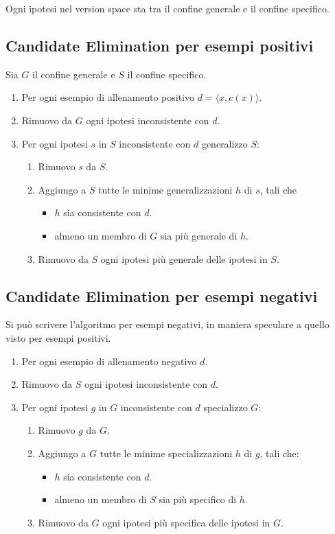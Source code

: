 \begin{theorem}
	Ogni ipotesi nel version space sta tra il confine generale e il confine specifico.
\end{theorem}

\subsection{Candidate Elimination per esempi positivi}
Sia $G$ il confine generale e $S$ il confine specifico.
\begin{enumerate}
	\item Per ogni esempio di allenamento positivo $d = \langle x, c(x) \rangle$.
	\item Rimuovo da $G$ ogni ipotesi inconsistente con $d$.
	\item Per ogni ipotesi $s$ in $S$ inconsistente con $d$ generalizzo $S$:
	      \begin{enumerate}
		      \item Rimuovo $s$ da $S$.
		      \item Aggiungo a $S$ tutte le minime generalizzazioni $h$ di $s$, tali che
		            \begin{itemize}
			            \item $h$ sia consistente con $d$.
			            \item almeno un membro di $G$ sia pi\`u generale di $h$.
		            \end{itemize}
		      \item Rimuovo da $S$ ogni ipotesi pi\`u generale delle ipotesi in $S$.
	      \end{enumerate}
\end{enumerate}

\subsection{Candidate Elimination per esempi negativi}
Si pu\`o scrivere l'algoritmo per esempi negativi, in maniera speculare a quello visto per esempi positivi.
\begin{enumerate}
	\item Per ogni esempio di allenamento negativo $d$.
	\item Rimuovo da $S$ ogni ipotesi inconsistente con $d$.
	\item Per ogni ipotesi $g$ in $G$ inconsistente con $d$ specializzo $G$:
	      \begin{enumerate}
		      \item Rimuovo $g$ da $G$.
		      \item Aggiungo a $G$ tutte le minime specializzazioni $h$ di $g$, tali che:
		            \begin{itemize}
			            \item $h$ sia consistente con $d$.
			            \item almeno un membro di $S$ sia pi\`u specifico di $h$.
		            \end{itemize}
		      \item Rimuovo da $G$ ogni ipotesi pi\`u specifica delle ipotesi in $G$.
	      \end{enumerate}
\end{enumerate}


